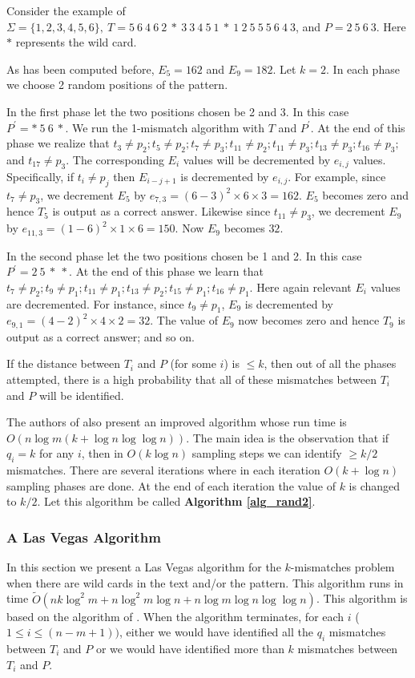  Consider the  example of $\Sigma=\{1,2,3,4,5,6\},~T=5~6~4~6~2~*~3~3~4~5~1~*~1~2~5~5~5~6~4~3$, and $P=2~5~6~3$.
Here $*$ represents the wild card.

As has been computed before, $E_5=162$ and $E_9=182$. Let $k=2$. In each phase we choose 2 random positions of the pattern.

In the first phase let the two positions chosen be 2 and 3. In this case $P^\prime=*~5~6~*$. We run the 1-mismatch algorithm with $T$ and $P^\prime$. At the end of this phase we realize that $t_3\neq p_2;t_5\neq p_2;t_7\neq p_3;t_{11}\neq p_2;t_{11}\neq p_3;t_{13}\neq p_3;t_{16}\neq p_3;$ and $t_{17}\neq p_3.$ The corresponding $E_i$ values will be decremented by $e_{i,j}$ values. Specifically, if $t_i\neq p_j$ then $E_{i-j+1}$ is decremented by $e_{i,j}$. For example, since $t_7\neq p_3$, we decrement $E_5$ by $e_{7,3}=(6-3)^2\times 6\times 3=162$. $E_5$ becomes zero and hence $T_5$ is output as a correct answer. Likewise since $t_{11}\neq p_3$, we decrement $E_9$ by $e_{11,3}=(1-6)^2\times 1\times 6=150$. Now $E_9$ becomes $32$. 

In the second phase let the two positions chosen be 1 and 2. In this case $P^\prime=2~5~*~*$. At the end of this phase we learn that $t_7\neq p_2;t_9\neq p_1;t_{11}\neq p_1;t_{13}\neq p_2;t_{15}\neq p_1;t_{16}\neq p_1$. Here again relevant $E_i$ values are decremented. For instance, since $t_9\neq p_1$, $E_9$ is decremented by $e_{9,1}=(4-2)^2\times 4\times 2=32$. The value of $E_9$ now becomes zero and hence $T_9$ is output as a correct answer; and so on.

If the distance between $T_i$ and $P$ (for some $i$) is $\leq k$, then out of all the phases attempted, there is a high probability that all of these mismatches between $T_i$ and $P$ will be identified.




The authors of \cite{CEP+07} also present an improved algorithm whose run time
is $O(n\log m(k+\log n\log\log n))$. The main idea is the observation that if
$q_i= k$ for any $i$, then in $O(k\log n)$ sampling steps we can identify $\geq
k/2$ mismatches. There are several iterations where in each iteration $O(k+\log
n)$ sampling phases are done. At the end of each iteration the value of $k$ is
changed to $k/2$. Let this algorithm be called {\bf Algorithm \ref{alg_rand2}}.
  
\subsubsection{A Las Vegas Algorithm}
\label{sec_las_vegas}
In this section we present a Las Vegas algorithm for the $k$-mismatches problem
when there are wild cards in the text and/or the pattern. This algorithm runs in
time $\widetilde O(nk\log^2m+n\log^2m\log n+n\log m\log n\log\log n)$. This
algorithm is based on the algorithm of \cite{CEP+07}. When the algorithm
terminates, for each $i$ ($1\leq i\leq (n-m+1))$, either we would have
identified all the $q_i$ mismatches between $T_i$ and $P$ or we would have
identified more than $k$ mismatches between $T_i$ and $P$.

